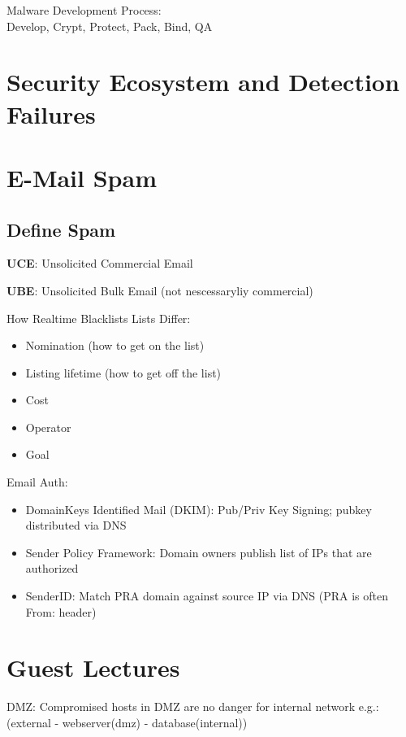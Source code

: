 \documentclass[fs, footer]{latex4ei}
\begin{document}
\begin{multicols*}{4}
Malware Development Process:
\\Develop, Crypt, Protect, Pack, Bind, QA

\section{Security Ecosystem and Detection Failures}

\section{E-Mail Spam}
\subsection{Define Spam}
\textbf{UCE}: Unsolicited Commercial Email

\textbf{UBE}: Unsolicited Bulk Email (not nescessaryliy commercial)

How Realtime Blacklists Lists Differ:
\begin{itemize}
	\item Nomination (how to get on the list)
	\item Listing lifetime (how to get off the list)
	\item Cost
	\item Operator
	\item Goal
\end{itemize}

Email Auth:
\begin{itemize}
	\item DomainKeys Identified Mail (DKIM): Pub/Priv Key Signing; pubkey distributed via DNS
	\item Sender Policy Framework: Domain owners publish list of IPs that are authorized
	\item SenderID: Match PRA domain against source IP via DNS (PRA is often From: header)
	\end{itemize}
	
\section{Guest Lectures}
DMZ: Compromised hosts in DMZ are no danger for internal network e.g.:(external - webserver(dmz) - database(internal))


\end{multicols*}

\end{document}
